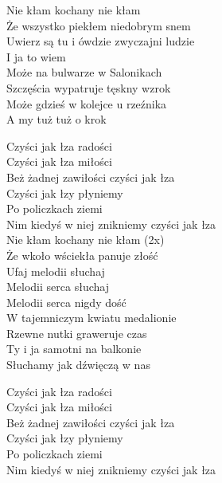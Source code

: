 \begin{text}
    \chordfill
    Nie kłam kochany nie kłam\\
    Że wszystko piekłem niedobrym snem\\
    Uwierz są tu i ówdzie zwyczajni ludzie\\
    I ja to wiem\\
    Może na bulwarze w Salonikach\\
    Szczęścia wypatruje tęskny wzrok\\
    Może gdzieś w kolejce u rzeźnika\\
    A my tuż tuż o krok

    \vin Czyści jak łza radości\\
    \vin Czyści jak łza miłości\\
    \vin Beż żadnej zawiłości czyści jak łza\\
    \vin Czyści jak łzy płyniemy\\
    \vin Po policzkach ziemi\\
    \vin Nim kiedyś w niej znikniemy czyści jak łza\\

    Nie kłam kochany nie kłam (2x)\\
    Że wkoło wściekła panuje złość\\
    Ufaj melodii słuchaj\\
    Melodii serca słuchaj\\
    Melodii serca nigdy dość\\
    W tajemniczym kwiatu medalionie\\
    Rzewne nutki graweruje czas\\
    Ty i ja samotni na balkonie\\
    Słuchamy jak dźwięczą w nas

    \vin Czyści jak łza radości\\
    \vin Czyści jak łza miłości\\
    \vin Beż żadnej zawiłości czyści jak łza\\
    \vin Czyści jak łzy płyniemy\\
    \vin Po policzkach ziemi\\
    \vin Nim kiedyś w niej znikniemy czyści jak łza

\end{text}
